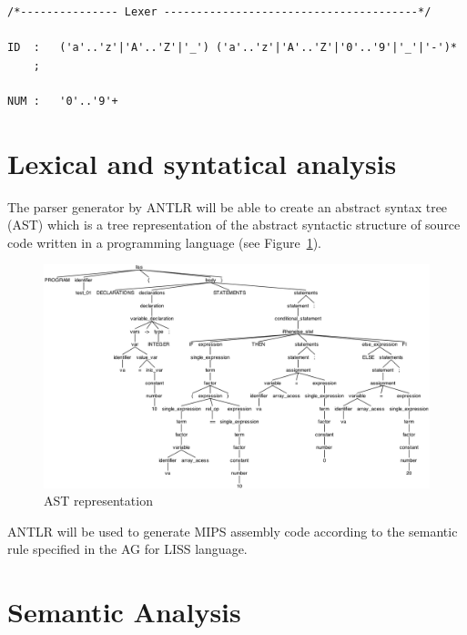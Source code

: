 \documentclass[
  oneside,
  11pt, a4paper,
  footinclude=true,
  headinclude=true,
  cleardoublepage=empty
]{scrbook}
\begin{document}
\begin{lstlisting}[caption={Lexer representation},label={lst:lexer}]
/*--------------- Lexer ---------------------------------------*/

ID  :   ('a'..'z'|'A'..'Z'|'_') ('a'..'z'|'A'..'Z'|'0'..'9'|'_'|'-')*
    ;

NUM :   '0'..'9'+
\end{lstlisting}



\section{Lexical and syntatical analysis}
\label{sct:lexical_and_syntatical_analysis}

The parser generator by ANTLR will be able to create an abstract syntax tree (AST) which is a tree representation of the abstract syntactic structure of source code written in a programming language (see Figure~\ref{fig:AST}).

\begin{figure}[h!]
  \centering
    \includegraphics[width=1\textwidth]{img/antlr4_parse_tree.png}
    \caption{AST representation}
    \label{fig:AST}
\end{figure}

ANTLR will be used to generate MIPS assembly code according to the semantic rule specified in the AG for LISS language.







\section{Semantic Analysis}
\label{sct:semantic_analysis}
\end{document}
